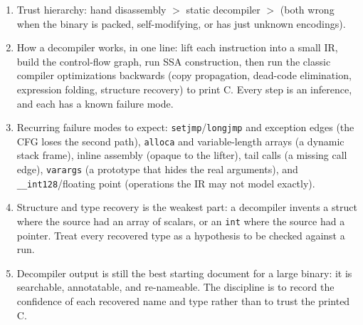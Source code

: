 \documentclass[12pt]{Training}
\begin{document}
\begin{enumerate}
\begin{enumerate}
        \item Trust hierarchy: hand disassembly $>$ static decompiler $>$ (both wrong when the binary is packed, self-modifying, or has just unknown encodings).
        \item How a decompiler works, in one line: lift each instruction into a small IR, build the control-flow graph, run SSA construction, then run the classic compiler optimizations backwards (copy propagation, dead-code elimination, expression folding, structure recovery) to print C. Every step is an inference, and each has a known failure mode.
        \item Recurring failure modes to expect: \lstinline{setjmp}/\lstinline{longjmp} and exception edges (the CFG loses the second path), \lstinline{alloca} and variable-length arrays (a dynamic stack frame), inline assembly (opaque to the lifter), tail calls (a missing call edge), \lstinline{varargs} (a prototype that hides the real arguments), and \lstinline{__int128}/floating point (operations the IR may not model exactly).
        \item Structure and type recovery is the weakest part: a decompiler invents a struct where the source had an array of scalars, or an \lstinline{int} where the source had a pointer. Treat every recovered type as a hypothesis to be checked against a run.
        \item Decompiler output is still the best starting document for a large binary: it is searchable, annotatable, and re-nameable. The discipline is to record the confidence of each recovered name and type rather than to trust the printed C.
    \end{enumerate}
\end{enumerate}
\end{document}
